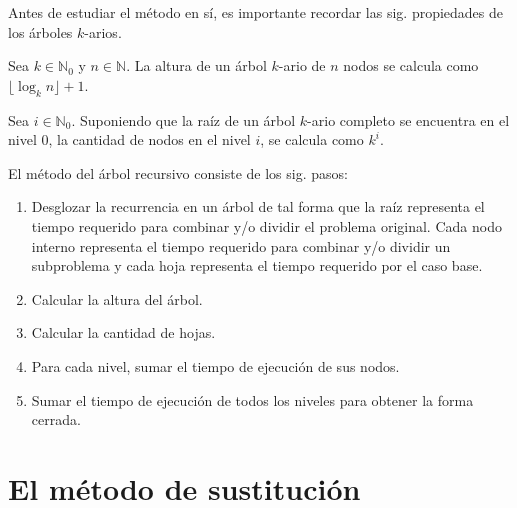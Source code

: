 Antes de estudiar el método en sí, es importante recordar las sig.
propiedades de los árboles $k$-arios.
\begin{prop}
Sea $k\in\mathbb{N}_{0}$ y $n\in\mathbb{N}$. La altura de un árbol
$k$-ario de $n$ nodos se calcula como $\lfloor\log_{k}n\rfloor+1$.
\end{prop}
%
\begin{prop}
Sea $i\in\mathbb{N}_{0}$. Suponiendo que la raíz de un árbol $k$-ario
completo se encuentra en el nivel 0, la cantidad de nodos en el nivel
$i$, se calcula como $k^{i}$.
\end{prop}
El método del árbol recursivo consiste de los sig. pasos:
\begin{enumerate}
\item Desglozar la recurrencia en un árbol de tal forma que la raíz representa
el tiempo requerido para combinar y/o dividir el problema original.
Cada nodo interno representa el tiempo requerido para combinar y/o
dividir un subproblema y cada hoja representa el tiempo requerido
por el caso base. 
\item Calcular la altura del árbol.
\item Calcular la cantidad de hojas.
\item Para cada nivel, sumar el tiempo de ejecución de sus nodos. 
\item Sumar el tiempo de ejecución de todos los niveles para obtener la
forma cerrada.
\end{enumerate}

\section{El método de sustitución}

